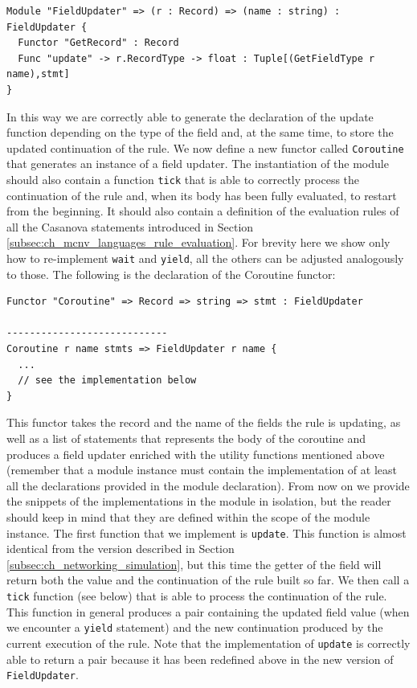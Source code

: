 \begin{lstlisting}
Module "FieldUpdater" => (r : Record) => (name : string) : FieldUpdater {
  Functor "GetRecord" : Record
  Func "update" -> r.RecordType -> float : Tuple[(GetFieldType r name),stmt]
}
\end{lstlisting}

\noindent
In this way we are correctly able to generate the declaration of the update function depending on the type of the field and, at the same time, to store the updated continuation of the rule. We now define a new functor called \texttt{Coroutine} that generates an instance of a field updater. The instantiation of the module should also contain a function \texttt{tick} that is able to correctly process the continuation of the rule and, when its body has been fully evaluated, to restart from the beginning. It should also contain a definition of the evaluation rules of all the Casanova statements introduced in Section \ref{subsec:ch_mcnv_languages_rule_evaluation}. For brevity here we show only how to re-implement \texttt{wait} and \texttt{yield}, all the others can be adjusted analogously to those. The following is the declaration of the Coroutine functor:

\begin{lstlisting}
Functor "Coroutine" => Record => string => stmt : FieldUpdater

----------------------------
Coroutine r name stmts => FieldUpdater r name {
  ... 
  // see the implementation below
}
\end{lstlisting}

\noindent
This functor takes the record and the name of the fields the rule is updating, as well as a list of statements that represents the body of the coroutine and produces a field updater enriched with the utility functions mentioned above (remember that a module instance must contain the implementation of at least all the declarations provided in the module declaration). From now on we provide the snippets of the implementations in the module in isolation, but the reader should keep in mind that they are defined within the scope of the module instance. The first function that we implement is \texttt{update}. This function is almost identical from the version described in Section \ref{subsec:ch_networking_simulation}, but this time the getter of the field will return both the value and the continuation of the rule built so far. We then call a \texttt{tick} function (see below) that is able to process the continuation of the rule. This function in general produces a pair containing the updated field value (when we encounter a \texttt{yield} statement) and the new continuation produced by the current execution of the rule. Note that the implementation of \texttt{update} is correctly able to return a pair because it has been redefined above in the new version of \texttt{FieldUpdater}.

